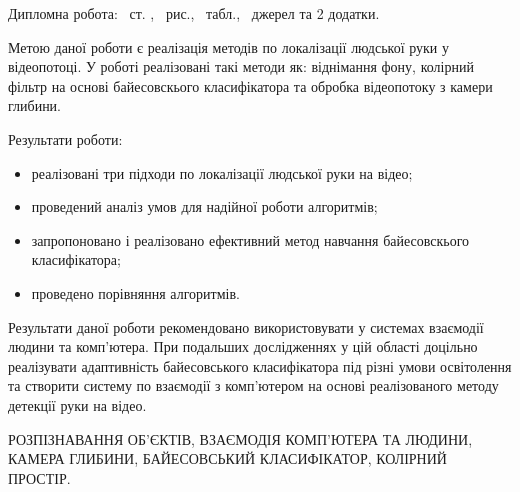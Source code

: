 
Дипломна робота: \pageref*{MyLastPage}~ст. , \totfig~рис.,  \tottab~табл., ~джерел та 2 додатки.

Метою даної роботи є реалізація методів по локалізації людської руки у відеопотоці. У роботі реалізовані такі методи як: віднімання фону, колірний фільтр на основі байесовскього класифікатора та обробка відеопотоку з камери глибини.

Результати роботи:
\begin{itemize}
	\item реалізовані три підходи по локалізації людської руки на відео;
	\item проведений аналіз умов для надійної роботи алгоритмів;
	\item запропоновано і реалізовано ефективний метод навчання байесовскього класифікатора;
	\item проведено порівняння алгоритмів.
\end{itemize}

Результати даної роботи рекомендовано використовувати у системах взаємодії людини та комп'ютера. При подальших дослідженнях у цій області доцільно реалізувати адаптивність байесовського класифікатора під різні умови освітолення та створити систему по взаємодії з комп'ютером на основі реалізованого методу детекції руки на відео.

\MakeUppercase{Розпізнавання об'єктів, взаємодія комп'ютера та людини, камера глибини, Байесовський класифікатор, колірний простір.} 